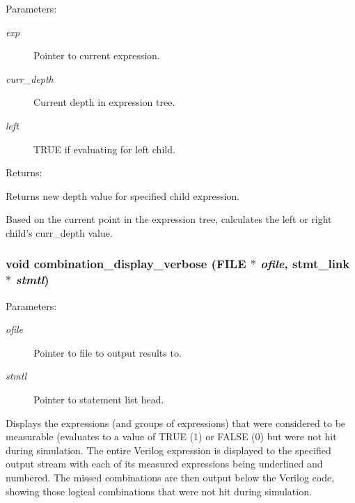 \begin{Desc}
\item[Parameters: ]\par
\begin{description}
\item[{\em 
exp}]Pointer to current expression. \item[{\em 
curr\_\-depth}]Current depth in expression tree. \item[{\em 
left}]TRUE if evaluating for left child.\end{description}
\end{Desc}
\begin{Desc}
\item[Returns: ]\par
Returns new depth value for specified child expression.\end{Desc}
Based on the current point in the expression tree, calculates the left or right child's curr\_\-depth value. 
\subsubsection{\setlength{\rightskip}{0pt plus 5cm}void combination\_\-display\_\-verbose (FILE $\ast$ {\em ofile}, {\bf stmt\_\-link} $\ast$ {\em stmtl})}\label{comb_8c_a17}


\begin{Desc}
\item[Parameters: ]\par
\begin{description}
\item[{\em 
ofile}]Pointer to file to output results to. \item[{\em 
stmtl}]Pointer to statement list head.\end{description}
\end{Desc}
Displays the expressions (and groups of expressions) that were considered  to be measurable (evaluates to a value of TRUE (1) or FALSE (0) but were  not hit during simulation. The entire Verilog expression is displayed to the specified output stream with each of its measured expressions being underlined and numbered. The missed combinations are then output below the Verilog code, showing those logical combinations that were not hit during simulation. 
